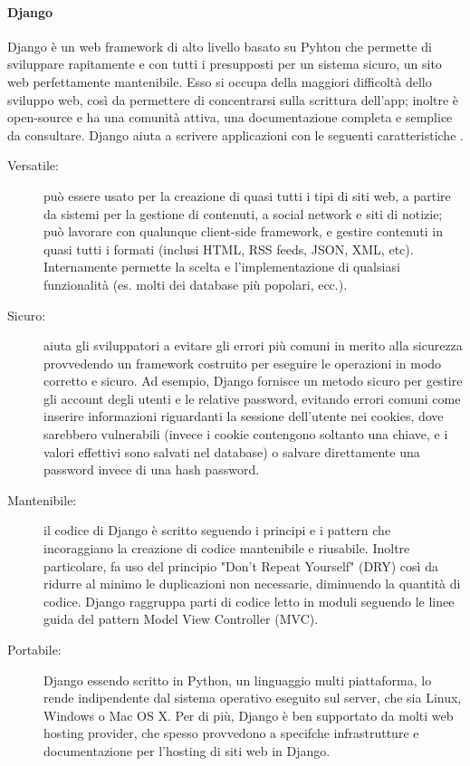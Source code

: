 \paragraph{Django}
Django è un web framework di alto livello basato su Pyhton che permette di sviluppare rapitamente e con tutti i presupposti per un sistema sicuro, un sito web
perfettamente mantenibile. Esso si occupa della maggiori difficoltà dello sviluppo web, così da permettere di concentrarsi sulla scrittura dell'app; inoltre 
è open-source e ha una comunità attiva, una documentazione completa e semplice da consultare.\hfill\break
Django aiuta a scrivere applicazioni con le seguenti caratteristiche \cite{django-documentation}.
\begin{description}
    \item[Versatile:] può essere usato per la creazione di quasi tutti i tipi di siti web, a partire da sistemi per la gestione di contenuti,
    a social network e siti di notizie; può lavorare con qualunque client-side framework, e gestire contenuti in quasi tutti i formati (inclusi HTML, 
    RSS feeds, JSON, XML, etc). Internamente permette la scelta e l'implementazione di qualsiasi funzionalità (es. molti dei database più popolari, ecc.).
    \item[Sicuro:] aiuta gli sviluppatori a evitare gli errori più comuni in merito alla sicurezza provvedendo un framework costruito per eseguire 
    le operazioni in modo corretto e sicuro. Ad esempio, Django fornisce un metodo sicuro per gestire gli account degli utenti e le relative 
    password, evitando errori comuni come inserire informazioni riguardanti la sessione dell'utente nei cookies, dove sarebbero vulnerabili (invece i cookie 
    contengono soltanto una chiave, e i valori effettivi sono salvati nel database) o salvare direttamente una password invece di una hash password.
    \item[Mantenibile:] il codice di Django è scritto seguendo i principi e i pattern che incoraggiano la creazione di codice mantenibile e riusabile. Inoltre 
    particolare, fa uso del principio "Don't Repeat Yourself" (DRY) così da ridurre al minimo le duplicazioni non necessarie, diminuendo la quantità di codice.
    Django raggruppa parti di codice letto in moduli seguendo le linee guida del pattern Model View Controller (MVC).
    \item[Portabile:] Django essendo scritto in Python, un linguaggio multi piattaforma, lo rende indipendente dal sistema operativo eseguito sul server, che 
    sia Linux, Windows o Mac OS X. Per di più, Django è ben supportato da molti web hosting provider, che spesso provvedono a specifche infrastrutture
    e documentazione per l'hosting di siti web in Django.
\end{description}
